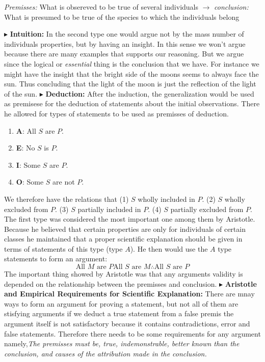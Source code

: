 \documentclass[9pt,a4paper,twocolumn]{article}
\newcounter{def}
\newcommand{\newpoint}[1]{\indent$\blacktriangleright$ \textbf{#1}}
\begin{document}
            \begin{define}
                \textit{Premisses:} What is obsereved to be true of several individuals $\longrightarrow$ \textit{conclusion:} What is presumed to be true of the species to which the individuals belong
            \end{define}
            \newpoint{Intuition:} In the second type one would argue not by the mass number of individuals properties, but by having an insight. In this sense we won't argue because there are many examples that supports our reasoning. But we argue since the logical or \textit{essential} thing is the conclusion that we have. For instance we might have the insight that the bright side of the moons seems to always face the sun. Thus concluding that the light of the moon is just the reflection of the light of the sun.
            \newpoint{Deduction:} After the induction, the generalization would be used as premisese for the deduction of statements about the initial observations. There he allowed for types of statements to be used as premisses of deduction.
            \begin{enumerate}
                \item \textbf{A}: All $S$ are $P$. 
                \item \textbf{E}: No $S$ is $P$.
                \item \textbf{I}: Some $S$ are $P$.
                \item \textbf{O}: Some $S$ are not $P$.
            \end{enumerate}
            We therefore have the relations that (1) $S$ wholly included in $P$. (2) $S$ wholly excluded from $P$. (3) $S$ partially included in $P$. (4) $S$ partially excluded from $P$. The first type was considered the most important one among them by Aristotle. Because he believed that certain properties are only for individuals of certain classes he maintained that a proper scientific explanation should be given in terms of statements of this type (type $A$). He then would use the $A$ type statements to form an argument:
            \begin{equation}
                \text{All } M \text{ are } P
                \text{All } S \text{ are } M
                \therefore \text{All } S \text{ are } P
            \end{equation}
            The important thing showed by Aristotle was that any arguments validity is depended on the relationship between the premisses and conclusion.\cite{Losee2001-cx}
            \newpoint{Aristotle and Empirical Requirements for Scientific Explanation:} There are mnay ways to form an argument for proving a statement, but not all of them are stisfying arguments if we deduct a true statement from a false premis the argument itself is not satisfactory because it contains contradictions, error and false statements. Therefore there needs to be some requirements for any argument namely,\textit{The premisses must be, true, indemonstrable, better known than the conclusion, and causes of the attribution made in the conclusion.}
\end{document}
